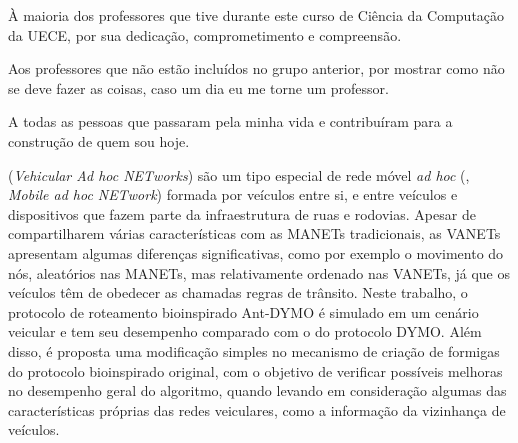 \noindent
À maioria dos professores que tive durante este curso de Ciência da
Computação da UECE, por sua dedicação, comprometimento e compreensão. 

\noindent
Aos professores que não estão incluídos no grupo anterior, por mostrar
como não se deve fazer as coisas, caso um dia eu me torne um professor.

\noindent
A todas as pessoas que passaram pela minha vida e contribuíram para a
construção de quem sou hoje.

\pagebreak

\makeepigrafe

\renewcommand{\contentsname}{SUMÁRIO}
\tableofcontents

\listadefiguras

\listadetabelas

\listadesiglas

\onehalfspace


\begin{resumo}
\noindent
{} (\textit{Vehicular Ad hoc NETworks})
são um tipo especial de rede móvel \textit{ad hoc} (, \textit{Mobile ad hoc NETwork}) formada por veículos entre si, e
entre veículos e dispositivos que fazem parte da infraestrutura de ruas e
rodovias. Apesar de compartilharem várias características com as MANETs
tradicionais, as VANETs apresentam algumas diferenças significativas, como por
exemplo o movimento do nós, aleatórios nas MANETs, mas relativamente ordenado
nas VANETs, já que os veículos têm de obedecer as chamadas regras de trânsito.
Neste trabalho, o protocolo de roteamento bioinspirado Ant-DYMO é simulado em
um cenário veicular e tem seu desempenho comparado com o do protocolo DYMO.
Além disso, é proposta uma modificação simples no mecanismo de criação de
formigas do protocolo bioinspirado original, com o objetivo de verificar
possíveis melhoras no desempenho geral do algoritmo, quando levando em
consideração algumas das características próprias das redes veiculares, como a
informação da vizinhança de veículos.

\vspace{1cm}
\noindent
\palavraschave
\end{resumo}
\pagebreak

